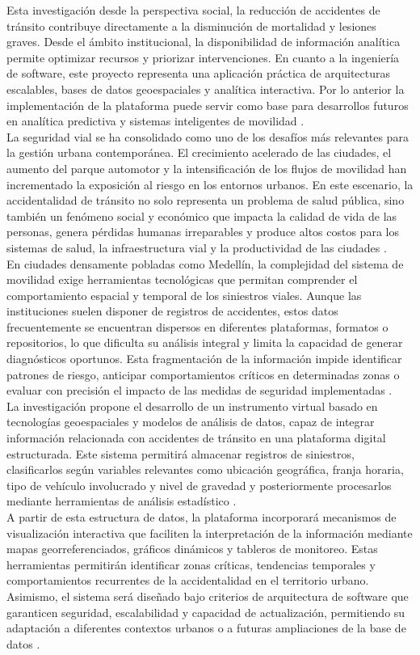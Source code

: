 Esta investigación desde la perspectiva social, la reducción de accidentes de tránsito contribuye directamente a la disminución de mortalidad y lesiones graves. Desde el ámbito institucional, la disponibilidad de información analítica permite optimizar recursos y priorizar intervenciones. En cuanto a la ingeniería de software, este proyecto representa una aplicación práctica de arquitecturas escalables, bases de datos geoespaciales y analítica interactiva. Por lo anterior la implementación de la plataforma puede servir como base para desarrollos futuros en analítica predictiva y sistemas inteligentes de movilidad \cite{londono2024}.\\
La seguridad vial se ha consolidado como uno de los desafíos más relevantes para la gestión urbana contemporánea. El crecimiento acelerado de las ciudades, el aumento del parque automotor y la intensificación de los flujos de movilidad han incrementado la exposición al riesgo en los entornos urbanos. En este escenario, la accidentalidad de tránsito no solo representa un problema de salud pública, sino también un fenómeno social y económico que impacta la calidad de vida de las personas, genera pérdidas humanas irreparables y produce altos costos para los sistemas de salud, la infraestructura vial y la productividad de las ciudades \cite{lugo2025}.\\
En ciudades densamente pobladas como Medellín, la complejidad del sistema de movilidad exige herramientas tecnológicas que permitan comprender el comportamiento espacial y temporal de los siniestros viales. Aunque las instituciones suelen disponer de registros de accidentes, estos datos frecuentemente se encuentran dispersos en diferentes plataformas, formatos o repositorios, lo que dificulta su análisis integral y limita la capacidad de generar diagnósticos oportunos. Esta fragmentación de la información impide identificar patrones de riesgo, anticipar comportamientos críticos en determinadas zonas o evaluar con precisión el impacto de las medidas de seguridad implementadas \cite{castrillon2025}.\\
La investigación propone el desarrollo de un instrumento virtual basado en tecnologías geoespaciales y modelos de análisis de datos, capaz de integrar información relacionada con accidentes de tránsito en una plataforma digital estructurada. Este sistema permitirá almacenar registros de siniestros, clasificarlos según variables relevantes como ubicación geográfica, franja horaria, tipo de vehículo involucrado y nivel de gravedad y posteriormente procesarlos mediante herramientas de análisis estadístico \cite{calvo2025}.\\
A partir de esta estructura de datos, la plataforma incorporará mecanismos de visualización interactiva que faciliten la interpretación de la información mediante mapas georreferenciados, gráficos dinámicos y tableros de monitoreo. Estas herramientas permitirán identificar zonas críticas, tendencias temporales y comportamientos recurrentes de la accidentalidad en el territorio urbano. Asimismo, el sistema será diseñado bajo criterios de arquitectura de software que garanticen seguridad, escalabilidad y capacidad de actualización, permitiendo su adaptación a diferentes contextos urbanos o a futuras ampliaciones de la base de datos \cite{torres2022}.

